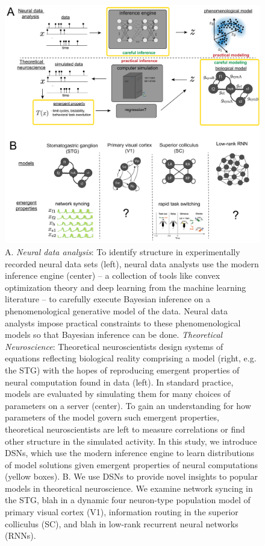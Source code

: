 \documentclass[11pt]{article}
\begin{document}
\begin{figure}
\begin{center}
\includegraphics[scale=0.2]{figs/fig1/fig1.pdf}
\end{center}
\caption{\small A. \textit{Neural data analysis}: To identify structure in experimentally recorded neural data sets (left), neural data analysts use the modern inference engine (center) -- a collection of tools like convex optimization theory and deep learning from the machine learning literature -- to carefully execute Bayesian inference on a phenomenological generative model of the data.  Neural data analysts impose practical constraints to these phenomenological models so that Bayesian inference can be done. \textit{Theoretical Neuroscience}: Theoretical neuroscientists design systems of equations reflecting biological reality comprising a model (right, e.g. the STG) with the hopes of reproducing emergent properties of neural computation found in data (left).  In standard practice, models are evaluated by simulating them for many choices of parameters on a server (center).  To gain an understanding for how parameters of the model govern such emergent properties, theoretical neuroscientists are left to measure correlations or find other structure in the simulated activity. In this study, we introduce DSNs, which use the modern inference engine to learn distributions of model solutions given emergent properties of neural computations (yellow boxes).  B. We use DSNs to provide novel insights to popular models in theoretical neuroscience.  We examine network syncing in the STG, blah in a dynamic four neuron-type population model of primary visual cortex (V1), information routing in the superior colliculus (SC), and blah in low-rank recurrent neural networks (RNNs).}
\end{figure}
\end{document}
